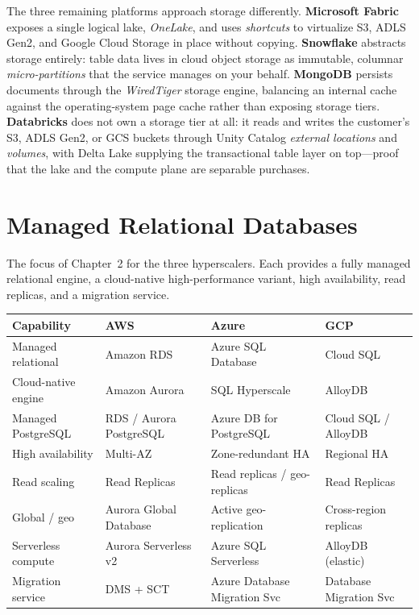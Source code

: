 \noindent The three remaining platforms approach storage differently.
\textbf{Microsoft Fabric} exposes a single logical lake, \emph{OneLake}, and uses
\emph{shortcuts} to virtualize S3, ADLS Gen2, and Google Cloud Storage in place without copying.
\textbf{Snowflake} abstracts storage entirely: table data lives in cloud object storage as
immutable, columnar \emph{micro-partitions} that the service manages on your behalf.
\textbf{MongoDB} persists documents through the \emph{WiredTiger} storage engine, balancing an
internal cache against the operating-system page cache rather than exposing storage tiers.
\textbf{Databricks} does not own a storage tier at all: it reads and writes the customer's S3,
ADLS Gen2, or GCS buckets through Unity Catalog \emph{external locations} and \emph{volumes},
with Delta Lake supplying the transactional table layer on top---proof that the lake and the
compute plane are separable purchases.

\section{Managed Relational Databases}
%
The focus of Chapter~2 for the three hyperscalers. Each provides a fully managed relational
engine, a cloud-native high-performance variant, high availability, read replicas, and a
migration service.

\begin{center}
\footnotesize
\begin{tabular}{@{}p{2.8cm}p{3.2cm}p{3.2cm}p{3.2cm}@{}}
\toprule
\textbf{Capability} & \textbf{AWS} & \textbf{Azure} & \textbf{GCP} \\
\midrule
Managed relational & Amazon RDS & Azure SQL Database & Cloud SQL \\
Cloud-native engine & Amazon Aurora & SQL Hyperscale & AlloyDB \\
Managed PostgreSQL & RDS / Aurora PostgreSQL & Azure DB for PostgreSQL & Cloud SQL / AlloyDB \\
High availability & Multi-AZ & Zone-redundant HA & Regional HA \\
Read scaling & Read Replicas & Read replicas / geo-replicas & Read Replicas \\
Global / geo & Aurora Global Database & Active geo-replication & Cross-region replicas \\
Serverless compute & Aurora Serverless v2 & Azure SQL Serverless & AlloyDB (elastic) \\
Migration service & DMS + SCT & Azure Database Migration Svc & Database Migration Svc \\
\bottomrule
\end{tabular}
\end{center}

